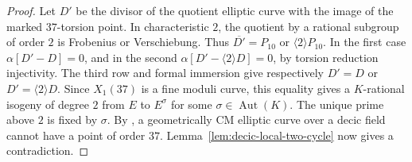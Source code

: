 \begin{proof}
Let $D'$ be the divisor of the quotient elliptic curve with the image
of the marked $37$-torsion point. In characteristic $2$, the quotient
by a rational subgroup of order $2$ is Frobenius or Verschiebung.
Thus $\overline{D'}=P_{10}$ or $\langle2\rangle P_{10}$.
In the first case $\alpha[D'-D]=0$, and in the second
$\alpha[D'-\langle2\rangle D]=0$, by torsion reduction injectivity.
The third row and formal immersion give respectively
$D'=D$ or $D'=\langle2\rangle D$.
Since $X_1(37)$ is a fine moduli curve, this equality gives a
$K$-rational isogeny of degree $2$ from $E$ to $E^\sigma$ for some
$\sigma\in\operatorname{Aut}(K)$. The unique prime above $2$ is fixed
by $\sigma$. By \cite[Section~4.10]{CCRS}, a geometrically CM elliptic
curve over a decic field cannot have a point of order $37$.
Lemma~\ref{lem:decic-local-two-cycle} now gives a contradiction.
\end{proof}
